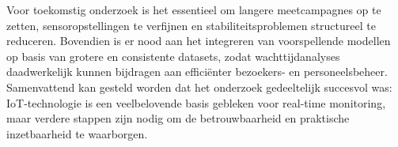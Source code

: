 Voor toekomstig onderzoek is het essentieel om langere meetcampagnes op te zetten, sensoropstellingen te verfijnen en stabiliteitsproblemen structureel te reduceren. Bovendien is er nood aan het integreren van voorspellende modellen op basis van grotere en consistente datasets, zodat wachttijdanalyses daadwerkelijk kunnen bijdragen aan efficiënter bezoekers- en personeelsbeheer. \\

Samenvattend kan gesteld worden dat het onderzoek gedeeltelijk succesvol was: IoT-technologie is een veelbelovende basis gebleken voor real-time monitoring, maar verdere stappen zijn nodig om de betrouwbaarheid en praktische inzetbaarheid te waarborgen.




